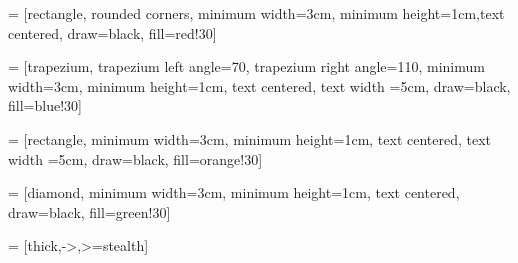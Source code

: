 \newcommand{\estwide}[3]{
		\vspace{.75ex}{
			\begin{tabular*}
			{\textwidth}{@{\hskip\tabcolsep\extracolsep\fill}l*{#2}{#3}}
			\toprule
			\estinput{#1}
			\bottomrule
			\addlinespace[.75ex]
			\end{tabular*}
			}
		}	

\newcommand{\estauto}[3]{
		\vspace{.75ex}{
			\begin{tabular}{l*{#2}{#3}}
			\toprule
			\estinput{#1}
			\bottomrule
			\addlinespace[.75ex]
			\end{tabular}
			}
		}

\newcommand{\specialcell}[2][c]{%
    \begin{tabular}[#1]{@{}c@{}}#2\end{tabular}
}



    
\usepackage{tikz}
\usetikzlibrary{shapes.geometric, arrows}

 = [rectangle, rounded corners, minimum width=3cm, minimum height=1cm,text centered, draw=black, fill=red!30]

 = [trapezium, trapezium left angle=70, trapezium right angle=110, minimum width=3cm, minimum height=1cm, text centered, text width =5cm, draw=black, fill=blue!30]

 = [rectangle, minimum width=3cm, minimum height=1cm, text centered, text width =5cm, draw=black, fill=orange!30]

 = [diamond, minimum width=3cm, minimum height=1cm, text centered, draw=black, fill=green!30]

 = [thick,->,>=stealth]
